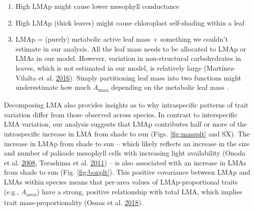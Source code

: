 \documentclass[
  12pt,
]{article}
\providecommand{\tightlist}{%
  \setlength{\itemsep}{0pt}\setlength{\parskip}{0pt}}
\begin{document}
\begin{enumerate}
\def\labelenumi{\arabic{enumi}.}
\tightlist
\item
  High LMAp might cause lower mesophyll conductance
\item
  High LMAp (thick leaves) might cause chloroplast self-shading within a leaf
\item
  LMAp = (purely) metabolic active leaf mass + something we couldn't estimate in our analysis. All the leaf mass needs to be allocated to LMAp or LMAs in our model. However, variation in non-structural carbohydrates in leaves, which is not estimated in our model, is relatively large (Martínez-Vilalta et al. \protect\hyperlink{ref-Martinez-Vilalta2016}{2016}). Simply partitioning leaf mass into two functions might underestimate how much \emph{A}\textsubscript{max} depending on the metabolic leaf mass .
\end{enumerate}

Decomposing LMA also provides insights as to why intraspecific patterns of trait variation differ from those observed across species.
In contrast to interspecific LMA variation, our analysis suggests that LMAp contributes half or more of the intraspecific increase in LMA from shade to sun (Figs. \ref{fig:massplt} and SX).
The increase in LMAp from shade to sun -- which likely reflects an increase in the size and number of palisade mesophyll cells with increasing light availability (Onoda et al. \protect\hyperlink{ref-Onoda2008}{2008}, Terashima et al. \protect\hyperlink{ref-Terashima2011}{2011}) -- is also associated with an increase in LMAs from shade to sun (Fig. \ref{fig:boxplt}).
This positive covariance between LMAp and LMAs within species means that per-area values of LMAp-proportional traits (e.g., \emph{A}\textsubscript{area}) have a strong, positive relationship with total LMA, which implies trait mass-proportionality (Osnas et al. \protect\hyperlink{ref-Osnas2018}{2018}).
\end{document}
